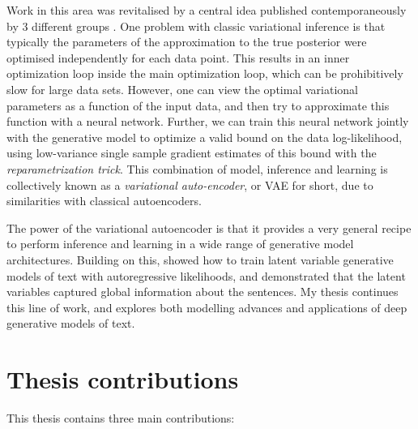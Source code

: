 Work in this area was revitalised by a central idea published contemporaneously by 3 different groups \citep{Kingma:14,Rezende:14,Titsias:14}. One problem with classic variational inference is that typically the parameters of the approximation to the true posterior were optimised independently for each data point. This results in an inner optimization loop inside the main optimization loop, which can be prohibitively slow for large data sets. However, one can view the optimal variational parameters as a function of the input data, and then try to approximate this function with a neural network. Further, we can train this neural network jointly with the generative model to optimize a valid bound on the data log-likelihood, using low-variance single sample gradient estimates of this bound with the \textit{reparametrization trick}. This combination of model, inference and learning is collectively known as a \textit{variational auto-encoder}, or VAE for short, due to similarities with classical autoencoders.


The power of the variational autoencoder is that it provides a very general recipe to perform inference and learning in a wide range of generative model architectures. Building on this, \citet{Bowman:16} showed how to train latent variable generative models of text with autoregressive likelihoods, and demonstrated that the latent variables captured global information about the sentences. My thesis continues this line of work, and explores both modelling advances and applications of deep generative models of text.

\section{Thesis contributions}

This thesis contains three main contributions:


